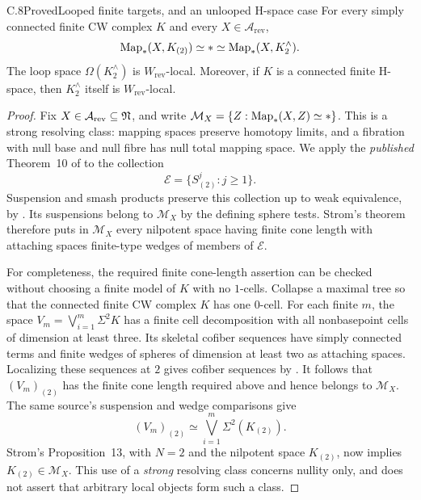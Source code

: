 \begin{claim}{C.8}{Proved}{Looped finite targets, and an unlooped H-space case}
For every simply connected finite CW complex $K$ and every $X\in\mathcal A_{\mathrm{rev}}$,
\[
 \operatorname{Map}_*(X,K_{(2)})\simeq *\simeq\operatorname{Map}_*(X,K^{\wedge}_2).
\]
The loop space $\Omega(K^{\wedge}_2)$ is $W_{\mathrm{rev}}$-local. Moreover, if $K$ is a connected finite H-space, then $K^{\wedge}_2$ itself is $W_{\mathrm{rev}}$-local.
\end{claim}
\begin{proof}
Fix $X\in\mathcal A_{\mathrm{rev}}\subseteq\mathfrak N$, and write
$\mathcal M_X=\{Z:\operatorname{Map}_*(X,Z)\simeq *\}$. This is a strong resolving class: mapping spaces preserve homotopy limits, and a fibration with null base and null fibre has null total mapping space. We apply the \emph{published} Theorem~10 of \citet{Strom2003} to the collection
\[
 \mathcal E=\{S^j_{(2)}:j\geq1\}.
\]
Suspension and smash products preserve this collection up to weak equivalence, by \cite[Propositions 6.4.2 and 6.4.6]{FGHMayPonto2012}. Its suspensions belong to $\mathcal M_X$ by the defining sphere tests. Strom's theorem therefore puts in $\mathcal M_X$ every nilpotent space having finite cone length with attaching spaces finite-type wedges of members of $\mathcal E$.

For completeness, the required finite cone-length assertion can be checked without choosing a finite model of $K$ with no $1$-cells. Collapse a maximal tree so that the connected finite CW complex $K$ has one $0$-cell. For each finite $m$, the space $V_m=\bigvee_{i=1}^m\Sigma^2K$ has a finite cell decomposition with all nonbasepoint cells of dimension at least three. Its skeletal cofiber sequences have simply connected terms and finite wedges of spheres of dimension at least two as attaching spaces. Localizing these sequences at $2$ gives cofiber sequences by \cite[Propositions 6.4.1 and 6.4.4]{FGHMayPonto2012}. It follows that $(V_m)_{(2)}$ has the finite cone length required above and hence belongs to $\mathcal M_X$. The same source's suspension and wedge comparisons give
\[
 (V_m)_{(2)}\simeq\bigvee_{i=1}^m\Sigma^2(K_{(2)}).
\]
Strom's Proposition~13, with $N=2$ and the nilpotent space $K_{(2)}$, now implies $K_{(2)}\in\mathcal M_X$. This use of a \emph{strong} resolving class concerns nullity only, and does not assert that arbitrary local objects form such a class.


\end{proof}
